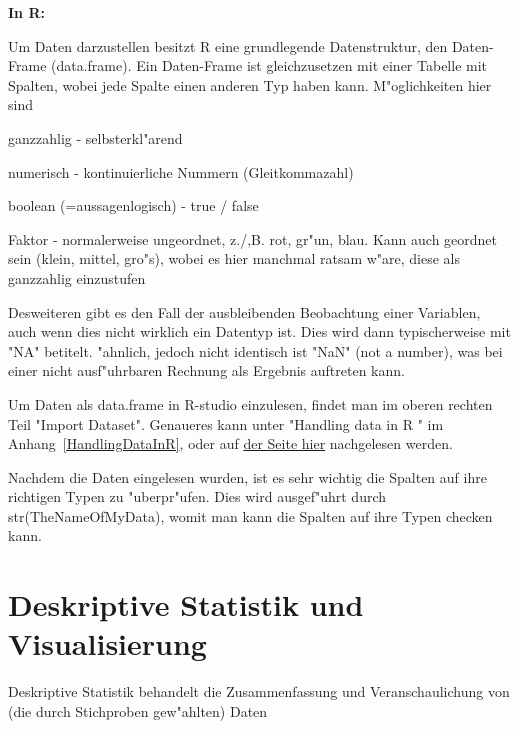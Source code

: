 \documentclass[a4paper,twoside]{tufte-book}\usepackage[]{graphicx}\usepackage[]{color}
\begin{document}
	
	\vspace{1cm}
	\begin{fullwidth}
		\begin{mdframed}
			
			\textbf{In R:} 
			
			Um Daten darzustellen besitzt R eine grundlegende Datenstruktur, den Daten-Frame (data.frame). Ein Daten-Frame ist gleichzusetzen mit einer Tabelle mit Spalten, wobei jede Spalte einen anderen Typ haben kann. M"oglichkeiten hier sind
			
			\begin{itemize*}
				\item ganzzahlig - selbsterkl"arend
				\item numerisch - kontinuierliche Nummern (Gleitkommazahl)
				\item boolean (=aussagenlogisch) - true / false
				\item Faktor - normalerweise ungeordnet, z./,B. rot, gr"un, blau. Kann auch geordnet sein (klein, mittel, gro"s), wobei es hier manchmal ratsam w"are, diese als ganzzahlig einzustufen
			\end{itemize*}
			
			Desweiteren gibt es den Fall der ausbleibenden Beobachtung einer Variablen, auch wenn dies nicht wirklich ein Datentyp ist. Dies wird dann typischerweise mit "NA" betitelt. "ahnlich, jedoch nicht identisch ist "NaN" (not a number), was bei einer nicht ausf"uhrbaren Rechnung als Ergebnis auftreten kann.
			
			Um Daten als data.frame in R-studio einzulesen, findet man im oberen rechten Teil "Import Dataset". Genaueres kann unter "Handling data in R " im Anhang~\ref{HandlingDataInR}, oder auf \href{http://biometry.github.io/APES/R/R20-DataStructures.html}{der Seite hier} nachgelesen werden.
			
			Nachdem die Daten eingelesen wurden, ist es sehr wichtig die Spalten auf ihre richtigen Typen zu "uberpr"ufen. Dies wird ausgef"uhrt durch str(TheNameOfMyData), womit man kann die Spalten auf ihre Typen checken kann.
			
		\end{mdframed}
	\end{fullwidth}
	
	
	\chapter{Deskriptive Statistik und Visualisierung}
	
	Deskriptive Statistik behandelt die Zusammenfassung und Veranschaulichung von (die durch Stichproben gew"ahlten) Daten
	
\end{document}
